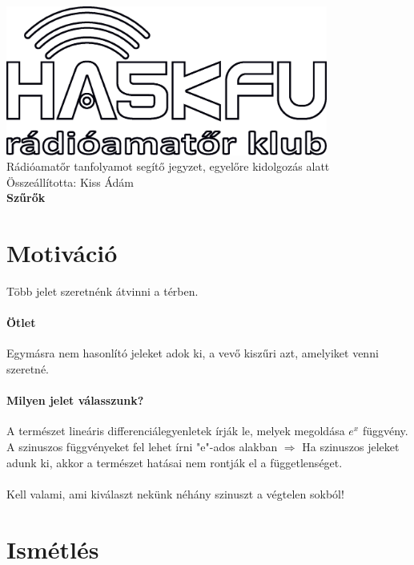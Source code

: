 \documentclass[12pt,a4paper]{article}
\begin{document}
\begin{center}
\includegraphics[width=300pt,keepaspectratio]{figures/ha5kfu.eps}
\\[0.5cm]
Rádióamatőr tanfolyamot segítő jegyzet, egyelőre kidolgozás alatt \\
Összeállította: Kiss Ádám %
\\[1cm]

{\huge \bfseries Szűrők \\[2cm]}



\end{center}

\renewcommand{\contentsname}{Tartalom}\tableofcontents 
\newpage
\section{Motiváció}

Több jelet szeretnénk átvinni a térben.

\paragraph{Ötlet} Egymásra nem hasonlító jeleket adok ki, a vevő kiszűri azt, amelyiket venni szeretné.

\paragraph{Milyen jelet válasszunk?} A természet lineáris differenciálegyenletek írják le, melyek megoldása $e^{x}$ függvény. A szinuszos függvényeket fel lehet írni "e"-ados alakban $\Rightarrow$ Ha szinuszos jeleket adunk ki, akkor a természet hatásai nem rontják el a függetlenséget.

\paragraph{} Kell valami, ami kiválaszt nekünk néhány szinuszt a végtelen sokból!
\section{Ismétlés}
\end{document}
